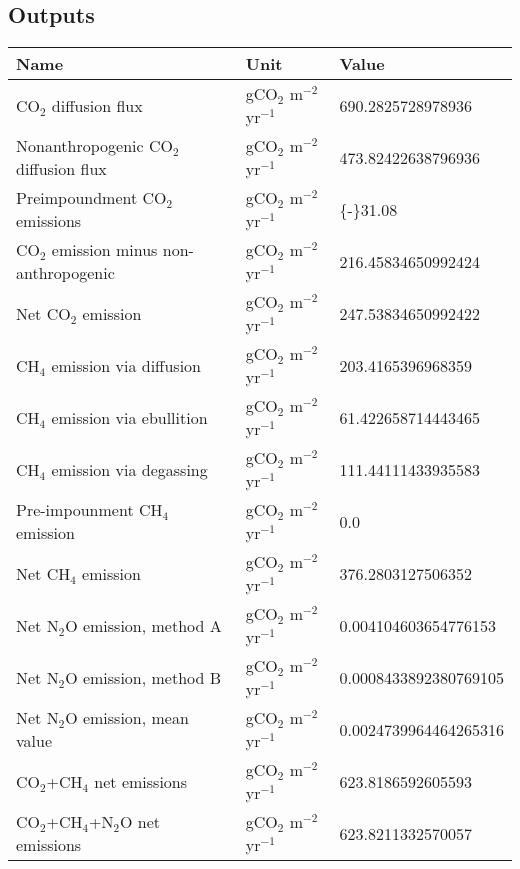\documentclass{article}%
\begin{document}
%
\subsection{Outputs}%
\label{subsec:Outputs}%
\begin{center}%
\renewcommand{\arraystretch}{1.0}%
\begin{tabu}{@{}p{10cm} X[c] X[l]@{}}%
\toprule%
\textbf{Name}&\textbf{Unit}&\textbf{Value}\\%
\midrule%
CO$_2$ diffusion flux&gCO$_2$ m$^{-2}$ yr$^{-1}$&\num[round-precision=4,round-mode=figures]{690.2825728978936}\\%
Nonanthropogenic CO$_2$ diffusion flux&gCO$_2$ m$^{-2}$ yr$^{-1}$&\num[round-precision=4,round-mode=figures]{473.82422638796936}\\%
Preimpoundment CO$_2$ emissions&gCO$_2$ m$^{-2}$ yr$^{-1}$&\num[round-precision=4,round-mode=figures]{{-}31.08}\\%
CO$_2$ emission minus non-anthropogenic&gCO$_2$ m$^{-2}$ yr$^{-1}$&\num[round-precision=4,round-mode=figures]{216.45834650992424}\\%
Net CO$_2$ emission&gCO$_2$ m$^{-2}$ yr$^{-1}$&\num[round-precision=4,round-mode=figures]{247.53834650992422}\\%
CH$_4$ emission via diffusion&gCO$_2$ m$^{-2}$ yr$^{-1}$&\num[round-precision=4,round-mode=figures]{203.4165396968359}\\%
CH$_4$ emission via ebullition&gCO$_2$ m$^{-2}$ yr$^{-1}$&\num[round-precision=4,round-mode=figures]{61.422658714443465}\\%
CH$_4$ emission via degassing&gCO$_2$ m$^{-2}$ yr$^{-1}$&\num[round-precision=4,round-mode=figures]{111.44111433935583}\\%
Pre-impounment CH$_4$ emission&gCO$_2$ m$^{-2}$ yr$^{-1}$&\num[round-precision=4,round-mode=figures]{0.0}\\%
Net CH$_4$ emission&gCO$_2$ m$^{-2}$ yr$^{-1}$&\num[round-precision=4,round-mode=figures]{376.2803127506352}\\%
Net N$_2$O emission, method A&gCO$_2$ m$^{-2}$ yr$^{-1}$&\num[round-precision=4,round-mode=figures]{0.004104603654776153}\\%
Net N$_2$O emission, method B&gCO$_2$ m$^{-2}$ yr$^{-1}$&\num[round-precision=4,round-mode=figures]{0.0008433892380769105}\\%
Net N$_2$O emission, mean value&gCO$_2$ m$^{-2}$ yr$^{-1}$&\num[round-precision=4,round-mode=figures]{0.0024739964464265316}\\%
\midrule%
CO$_2$+CH$_4$ net emissions&gCO$_2$ m$^{-2}$ yr$^{-1}$&\num[round-precision=4,round-mode=figures]{623.8186592605593}\\%
\midrule%
CO$_2$+CH$_4$+N$_2$O net emissions&gCO$_2$ m$^{-2}$ yr$^{-1}$&\num[round-precision=4,round-mode=figures]{623.8211332570057}\\\bottomrule%
%
\end{tabu}%
\end{center}%
\end{document}
